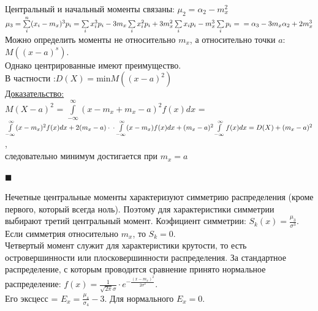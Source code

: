 \documentclass[russian, 12pt, fleqn,x11names]{article}
\begin{document}
Центральный и начальный моменты связаны: $\mu_2 = \alpha_2 - m_x^2$\\
$\mu_3 = \sum\limits_{i}^{n}(x_i-m_x)^3p_i =\sum\limits_{i}^{}x_i^3p_i - 3m_x\sum\limits_{i}^{ }x_i^2p_i + 3m_x^2\sum\limits_{i}^{ }x_ip_i - m_x^3\sum\limits_{i}^{ }p_i = \\
= \alpha_3 - 3 m_x \alpha_2  + 2m_x^3$\\
Можно определить моменты не относительно $m_x$, а относительно точки $a$:\\ $M((x-a)^s)$.\\
Однако центрированные имеют преимущество.
\\В  частности :$D(X) = $min$ M((x-a)^2)$\\
\underline{Доказательство:}\\
$M(X-a)^2$ = $\int\limits_{-\infty}^{\infty}(x-m_x+m_x-a)^2f(x)dx$ = $\int\limits_{-\infty}^{\infty}(x-m_x)^2f(x)dx + 2(m_x-a)\cdot \\
 \cdot \int\limits_{-\infty}^{\infty}(x-m_x)f(x)dx + (m_x - a)^2 \int\limits_{-\infty}^{\infty} f(x)dx = D(X) + (m_x-a)^2$,\\ следовательно минимум достигается при $m_x=a$
\begin{flushright}\(\blacksquare\)\end{flushright}
Нечетные центральные моменты характеризуют симметрию распределения (кроме первого, который всегда ноль). Поэтому для характеристики симметрии выбирают третий центральный  момент.
Коэфициент симметрии: $S_k(x) = \frac{\mu_3}{\sigma^3}$.\\
Если симметрия относительно $m_x$, то $S_k = 0$.\\
Четвертый момент служит для характеристики крутости, то есть\\
 островершинности или плосковершинности распределения. За стандартное распределение,  с которым проводится сравнение принято нормальное распределение: $f(x) = \frac{1}{\sqrt{2\pi}\sigma}\cdot e^{-\frac{(x-m_x)^2}{2\sigma^2}}$. \\
Его эксцесс = $E_x = \frac{\mu_4}{\sigma_4} - 3$. Для нормального $E_x = 0$.
\end{document}
